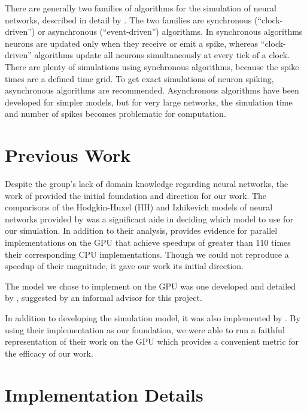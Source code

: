 \documentclass[a4paper]{article}
\begin{document}
There are generally two families of algorithms for the simulation of neural networks, described in detail by \cite{spike}. The two families are synchronous (“clock-driven”) or asynchronous (“event-driven”) algorithms. In synchronous algorithms neurons are updated only when they receive or emit a spike, whereas “clock-driven” algorithms update all neurons simultaneously at every tick of a clock. There are plenty of simulations using synchronous algorithms, because the spike times are a defined time grid. To get exact simulations of neuron spiking, asynchronous algorithms are recommended. Asynchronous algorithms have been developed for simpler models, but for very large networks, the simulation time and number of spikes becomes problematic for computation.


\section{Previous Work}
Despite the group's lack of domain knowledge regarding neural networks, the work of \cite{accel} provided the initial foundation and direction for our work. The comparisons of the Hodgkin-Huxel (HH) and Izhikevich models of neural networks provided by \cite{accel} was a significant aide in deciding which model to use for our simulation. In addition to their analysis, \cite{accel} provides evidence for parallel implementations on the GPU that achieve speedups of greater than 110 times their corresponding CPU implementations. Though we could not reproduce a speedup of their magnitude, it gave our work its initial direction.

The model we chose to implement on the GPU was one developed and detailed by \cite{synfire}, suggested by an informal advisor for this project.

In addition to developing the simulation model, it was also implemented by \cite{synfire}. By using their implementation as our foundation, we were able to run a faithful representation of their work on the GPU which provides a convenient metric for the efficacy of our work.




\section{Implementation Details}

\end{document}

